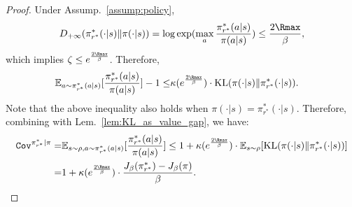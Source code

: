 \begin{proof}
    Under Assump.~\ref{assump:policy},
    \begin{align*}
        D_{+\infty}(\pi^*_{r^*}(\cdot|s)\|\pi(\cdot|s)) = \log \exp(\max_a \frac{\pi^*_{r^*}(a|s)}{\pi(a|s)}) \leq \frac{2{\Rmax}}{\beta},
    \end{align*}
    which implies $\zeta \leq e^{\frac{{2\Rmax}}{\beta}}$.
    Therefore,
    \begin{align*}
        \EE_{a\sim\pi^*_{r^*}(a|s)}[\frac{\pi^*_{r^*}(a|s)}{\pi(a|s)}] - 1 \leq & \kappa(e^{\frac{2{\Rmax}}{\beta}})  \cdot \KL(\pi(\cdot|s)\|\pi^*_{r^*}(\cdot|s)).
    \end{align*}
    Note that the above inequality also holds when $\pi(\cdot|s) = \pi^*_{r^*}(\cdot|s)$. Therefore, combining with Lem.~\ref{lem:KL_as_value_gap}, we have:
    \begin{align*}
        \cov^{\pi^*_{r^*}|\pi} =& \EE_{s\sim\rho,a\sim\pi^*_{r^*}(a|s)}[\frac{\pi^*_{r^*}(a|s)}{\pi(a|s)}] \leq 1 + \kappa(e^{\frac{2{\Rmax}}{\beta}}) \cdot \EE_{s\sim\rho}[\KL(\pi(\cdot|s)\|\pi^*_{r^*}(\cdot|s))] \\
        = & 1 + \kappa(e^{\frac{2{\Rmax}}{\beta}}) \cdot \frac{J_\beta(\pi^*_{r^*}) - J_\beta(\pi)}{\beta}. 
    \end{align*}

\end{proof}




%
%
%
%
%
%
%
%
%
%
%
%
%

